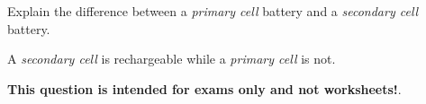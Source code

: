 

Explain the difference between a {\it primary cell} battery and a {\it secondary cell} battery.







A {\it secondary cell} is rechargeable while a {\it primary cell} is not.







{\bf This question is intended for exams only and not worksheets!}.




